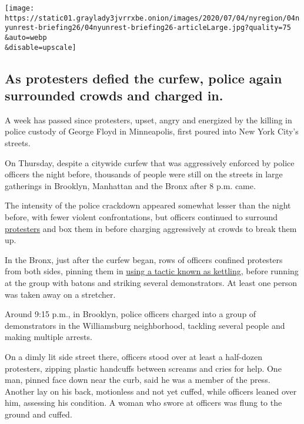 \texttt{[image: https://static01.graylady3jvrrxbe.onion/images/2020/07/04/nyregion/04nyunrest-briefing26/04nyunrest-briefing26-articleLarge.jpg?quality=75\\\&auto=webp\\\&disable=upscale]}

\hypertarget{as-protesters-defied-the-curfew-police-again-surrounded-crowds-and-charged-in}{%
\subsection{As protesters defied the curfew, police again surrounded
crowds and charged
in.}\label{as-protesters-defied-the-curfew-police-again-surrounded-crowds-and-charged-in}}

A week has passed since protesters, upset, angry and energized by the
killing in police custody of George Floyd in Minneapolis, first poured
into New York City's streets.

On Thursday, despite a citywide curfew that was aggressively enforced by
police officers the night before, thousands of people were still on the
streets in large gatherings in Brooklyn, Manhattan and the Bronx after 8
p.m. came.

The intensity of the police crackdown appeared somewhat lesser than the
night before, with fewer violent confrontations, but officers continued
to surround
\href{https://www.nytimes3xbfgragh.onion/2020/07/17/us/portland-protests.html}{protesters}
and box them in before charging aggressively at crowds to break them up.

In the Bronx, just after the curfew began, rows of officers confined
protesters from both sides, pinning them in
\href{https://www.nytimes3xbfgragh.onion/2020/06/05/nyregion/police-kettling-protests-nyc.html}{using
a tactic known as kettling}, before running at the group with batons and
striking several demonstrators. At least one person was taken away on a
stretcher.

Around 9:15 p.m., in Brooklyn, police officers charged into a group of
demonstrators in the Williamsburg neighborhood, tackling several people
and making multiple arrests.

On a dimly lit side street there, officers stood over at least a
half-dozen protesters, zipping plastic handcuffs between screams and
cries for help. One man, pinned face down near the curb, said he was a
member of the press. Another lay on his back, motionless and not yet
cuffed, while officers leaned over him, assessing his condition. A woman
who swore at officers was flung to the ground and cuffed.


